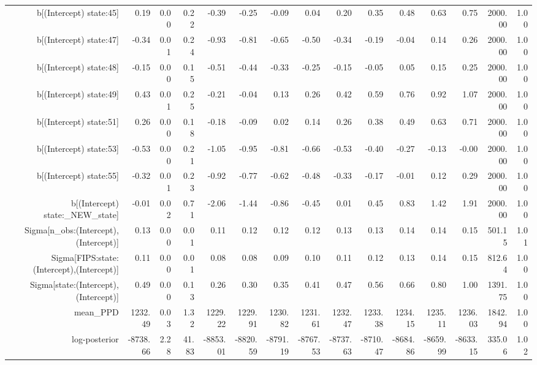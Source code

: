 \begin{table}[ht]
\begin{tabular}{rrrrrrrrrrrrrrr}
  b[(Intercept) state:45] & 0.19 & 0.00 & 0.22 & -0.39 & -0.25 & -0.09 & 0.04 & 0.20 & 0.35 & 0.48 & 0.63 & 0.75 & 2000.00 & 1.00 \\ 
  b[(Intercept) state:47] & -0.34 & 0.01 & 0.24 & -0.93 & -0.81 & -0.65 & -0.50 & -0.34 & -0.19 & -0.04 & 0.14 & 0.26 & 2000.00 & 1.00 \\ 
  b[(Intercept) state:48] & -0.15 & 0.00 & 0.15 & -0.51 & -0.44 & -0.33 & -0.25 & -0.15 & -0.05 & 0.05 & 0.15 & 0.25 & 2000.00 & 1.00 \\ 
  b[(Intercept) state:49] & 0.43 & 0.01 & 0.25 & -0.21 & -0.04 & 0.13 & 0.26 & 0.42 & 0.59 & 0.76 & 0.92 & 1.07 & 2000.00 & 1.00 \\ 
  b[(Intercept) state:51] & 0.26 & 0.00 & 0.18 & -0.18 & -0.09 & 0.02 & 0.14 & 0.26 & 0.38 & 0.49 & 0.63 & 0.71 & 2000.00 & 1.00 \\ 
  b[(Intercept) state:53] & -0.53 & 0.00 & 0.21 & -1.05 & -0.95 & -0.81 & -0.66 & -0.53 & -0.40 & -0.27 & -0.13 & -0.00 & 2000.00 & 1.00 \\ 
  b[(Intercept) state:55] & -0.32 & 0.01 & 0.23 & -0.92 & -0.77 & -0.62 & -0.48 & -0.33 & -0.17 & -0.01 & 0.12 & 0.29 & 2000.00 & 1.00 \\ 
  b[(Intercept) state:\_NEW\_state] & -0.01 & 0.02 & 0.71 & -2.06 & -1.44 & -0.86 & -0.45 & 0.01 & 0.45 & 0.83 & 1.42 & 1.91 & 2000.00 & 1.00 \\ 
  Sigma[n\_obs:(Intercept),(Intercept)] & 0.13 & 0.00 & 0.01 & 0.11 & 0.12 & 0.12 & 0.12 & 0.13 & 0.13 & 0.14 & 0.14 & 0.15 & 501.15 & 1.01 \\ 
  Sigma[FIPS:state:(Intercept),(Intercept)] & 0.11 & 0.00 & 0.01 & 0.08 & 0.08 & 0.09 & 0.10 & 0.11 & 0.12 & 0.13 & 0.14 & 0.15 & 812.64 & 1.00 \\ 
  Sigma[state:(Intercept),(Intercept)] & 0.49 & 0.00 & 0.13 & 0.26 & 0.30 & 0.35 & 0.41 & 0.47 & 0.56 & 0.66 & 0.80 & 1.00 & 1391.75 & 1.00 \\ 
  mean\_PPD & 1232.49 & 0.03 & 1.32 & 1229.22 & 1229.91 & 1230.82 & 1231.61 & 1232.47 & 1233.38 & 1234.15 & 1235.11 & 1236.03 & 1842.94 & 1.00 \\ 
  log-posterior & -8738.66 & 2.28 & 41.83 & -8853.01 & -8820.59 & -8791.19 & -8767.53 & -8737.63 & -8710.47 & -8684.86 & -8659.99 & -8633.15 & 335.06 & 1.02 \\ 
   \hline
\end{tabular}
\end{table}
